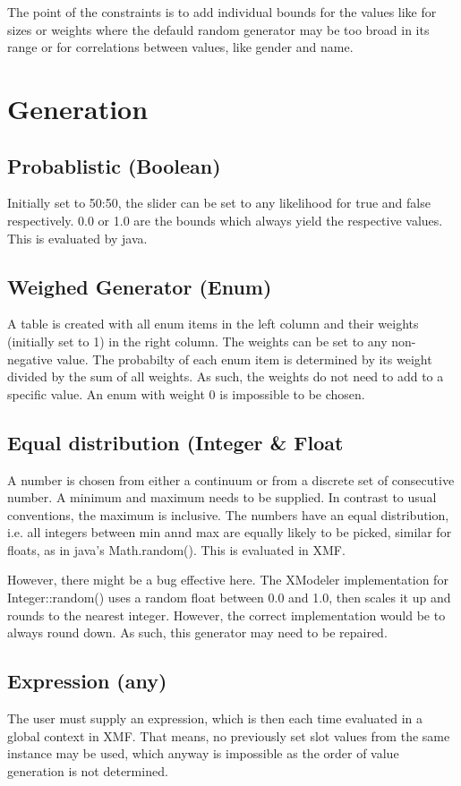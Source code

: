 \documentclass [11pt,letterpaper,twoside,openright]{book}
\begin{document}
The point of the constraints is to add individual bounds for the values like for sizes or weights where the defauld random generator may be too broad in its range or for correlations between values, like gender and name.

\section{Generation}
\subsection{Probablistic (Boolean)}
Initially set to 50:50, the slider can be set to any likelihood for true and false respectively. 0.0 or 1.0 are the bounds which always yield the respective values. This is evaluated by java.

\subsection{Weighed Generator (Enum)}
A table is created with all enum items in the left column and their weights (initially set to 1) in the right column. The weights can be set to any non-negative value. The probabilty of each enum item is determined by its weight divided by the sum of all weights. As such, the weights do not need to add to a specific value. An enum with weight 0 is impossible to be chosen.

\subsection{Equal distribution (Integer \& Float}
A number is chosen from either a continuum or from a discrete set of consecutive number. A minimum and maximum needs to be supplied. In contrast to usual conventions, the maximum is inclusive. The numbers have an equal distribution, i.e. all integers between min annd max are equally likely to be picked, similar for floats, as in java's Math.random(). 
This is evaluated in XMF.

However, there might be a bug effective here. The XModeler implementation for Integer::random() uses a random float between 0.0 and 1.0, then scales it up and rounds to the nearest integer. However, the correct implementation would be to always round down. As such, this generator may need to be repaired.

\subsection{Expression (any)}
The user must supply an expression, which is then each time evaluated in a global context in XMF. That means, no previously set slot values from the same instance may be used, which anyway is impossible as the order of value generation is not determined.
\end{document}
